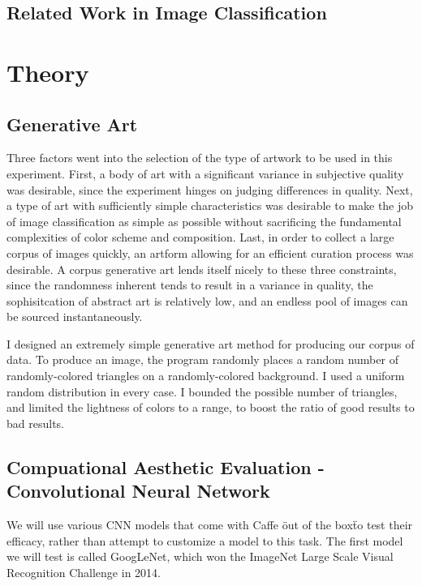 \documentclass[midd]{thesis}
\begin{document}
\section{Related Work in Image Classification}

\chapter{Theory}

\section{Generative Art}

Three factors went into the selection of the type of artwork to be used in this experiment. First, a body of art with a significant variance in subjective quality was desirable, since the experiment hinges on judging differences in quality. Next, a type of art with sufficiently simple characteristics was desirable to make the job of image classification as simple as possible without sacrificing the fundamental complexities of color scheme and composition. Last, in order to collect a large corpus of images quickly, an artform allowing for an efficient curation process was desirable. A corpus generative art lends itself nicely to these three constraints, since the randomness inherent tends to result in a variance in quality, the sophisitcation of abstract art is relatively low, and an endless pool of images can be sourced instantaneously.

I designed an extremely simple generative art method for producing our corpus of data. To produce an image, the program randomly places a random number of randomly-colored triangles on a randomly-colored background. I used a uniform random distribution in every case. I bounded the possible number of triangles, and limited the lightness of colors to a range, to boost the ratio of good results to bad results.

\section{Compuational Aesthetic Evaluation - Convolutional Neural Network}

We will use various CNN models that come with Caffe \"out of the box\" to test their efficacy, rather than attempt to customize a model to this task. The first model we will test is called GoogLeNet, which won the ImageNet Large Scale Visual Recognition Challenge in 2014.
\end{document}
